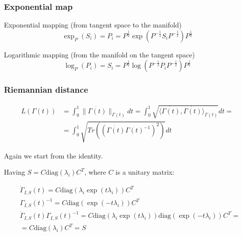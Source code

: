 \documentclass{beamer}
\begin{document}
\begin{frame}
\frametitle{Exponential map}
\begin{block}{Exponential mapping (from tangent space to the manifold)}
	\begin{equation*}
	\exp_P(S_i)  = P_i = P^{\frac12} \exp(P^{-\frac12}S_iP^{-\frac12})P^{\frac12}
	\end{equation*}
\end{block}
\vfill
\begin{block}{Logarithmic mapping (from the manifold on the tangent space)}
	\begin{equation*}
	\log_P(P_i)  = S_i = P^{\frac12} \log(P^{-\frac12}P_iP^{-\frac12})P^{\frac12}
	\end{equation*}
\end{block}
\end{frame}
\begin{frame}
\frametitle{Riemannian distance}
\begin{block}{ }
	\begin{align*}
	L(\Gamma(t)) & = \int_{0}^{1} \|\dot{\Gamma(t)}\|_{\Gamma(t)}dt =  \int_{0}^{1}\sqrt{\langle \dot{\Gamma(t)}, \dot{\Gamma(t)} \rangle_{\Gamma(t)}}dt = \\
	 & =   \int_{0}^{1}\sqrt{Tr\left( (\dot{\Gamma(t)}\Gamma(t)^{-1})^2 \right) }dt
	\end{align*}
\end{block}
Again we start from the identity.

Having $S =  C\text{diag}(\lambda_i)C^T$, where $C$ is a unitary matrix:
\begin{block}{ }
	\begin{align*}
	&\dot{\Gamma}_{I,S}(t) = C\text{diag}(\lambda_i\exp(t \lambda_i))C^T \\
	&\Gamma_{I,S}(t)^{-1} = C\text{diag}(\exp( - t \lambda_i))C^T \\
&	\dot{\Gamma}_{I,S}(t)\Gamma_{I,S}(t)^{-1} = C\text{diag}(\lambda_i\exp(t \lambda_i))\text{diag}(\exp( - t \lambda_i))C^T = \\&=C\text{diag}(\lambda_i) C^T = S
	\end{align*}
\end{block}

\end{frame}
\end{document}
